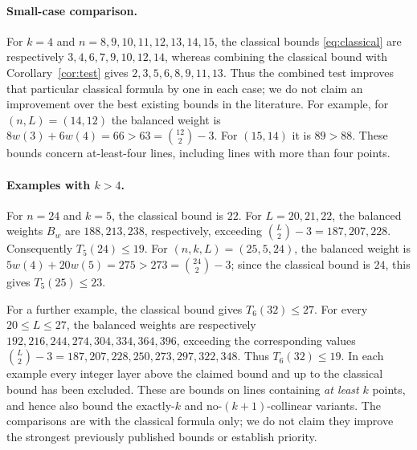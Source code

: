 \documentclass[11pt,a4paper]{amsart}
\theoremstyle{remark}\newtheorem{remark}[theorem]{Remark}
\begin{document}
\paragraph{Small-case comparison.}
For $k=4$ and $n=8,9,10,11,12,13,14,15$, the classical bounds \eqref{eq:classical} are respectively $3,4,6,7,9,10,12,14$, whereas combining the classical bound with Corollary~\ref{cor:test} gives $2,3,5,6,8,9,11,13$. Thus the combined test improves that particular classical formula by one in each case; we do not claim an improvement over the best existing bounds in the literature. For example, for $(n,L)=(14,12)$ the balanced weight is $8w(3)+6w(4)=66>63=\binom{12}{2}-3$. For $(15,14)$ it is $89>88$. These bounds concern at-least-four lines, including lines with more than four points.

\paragraph{Examples with $k>4$.}
For $n=24$ and $k=5$, the classical bound is $22$. For $L=20,21,22$, the balanced weights $B_w$ are $188,213,238$, respectively, exceeding $\binom L2-3=187,207,228$. Consequently $T_5(24)\le19$. For $(n,k,L)=(25,5,24)$, the balanced weight is $5w(4)+20w(5)=275>273=\binom{24}{2}-3$; since the classical bound is $24$, this gives $T_5(25)\le23$.

For a further example, the classical bound gives $T_6(32)\le27$. For every $20\le L\le27$, the balanced weights are respectively $192,216,244,274,304,334,364,396$, exceeding the corresponding values $\binom L2-3=187,207,228,250,273,297,322,348$. Thus $T_6(32)\le19$. In each example every integer layer above the claimed bound and up to the classical bound has been excluded. These are bounds on lines containing \emph{at least} $k$ points, and hence also bound the exactly-$k$ and no-$(k+1)$-collinear variants. The comparisons are with the classical formula only; we do not claim they improve the strongest previously published bounds or establish priority.
\end{document}
